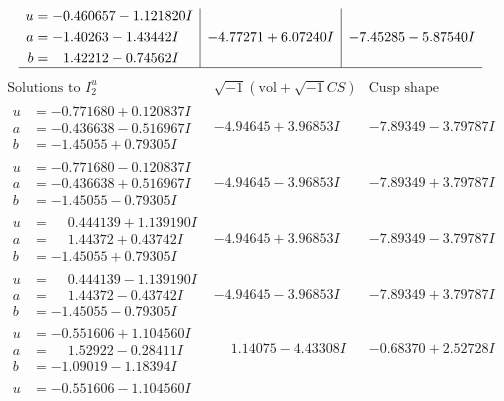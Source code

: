 \documentclass[1p]{elsarticle_modified}
\theoremstyle{definition}
\newcommand{\I}{\sqrt{-1}}
\begin{document}
$$\begin{array}{c|c|c}
\begin{aligned}
u &= -0.460657 - 1.121820 I \\
a &= -1.40263 - 1.43442 I \\
b &= \phantom{-}1.42212 - 0.74562 I\end{aligned}
 & -4.77271 + 6.07240 I & -7.45285 - 5.87540 I\\
 \hline 
 \end{array}$$\newpage$$\begin{array}{c|c|c}  
\text{Solutions to }I^u_{2}& \I (\text{vol} + \sqrt{-1}CS) & \text{Cusp shape}\\
 \hline 
\begin{aligned}
u &= -0.771680 + 0.120837 I \\
a &= -0.436638 - 0.516967 I \\
b &= -1.45055 + 0.79305 I\end{aligned}
 & -4.94645 + 3.96853 I & -7.89349 - 3.79787 I \\ \hline\begin{aligned}
u &= -0.771680 - 0.120837 I \\
a &= -0.436638 + 0.516967 I \\
b &= -1.45055 - 0.79305 I\end{aligned}
 & -4.94645 - 3.96853 I & -7.89349 + 3.79787 I \\ \hline\begin{aligned}
u &= \phantom{-}0.444139 + 1.139190 I \\
a &= \phantom{-}1.44372 + 0.43742 I \\
b &= -1.45055 + 0.79305 I\end{aligned}
 & -4.94645 + 3.96853 I & -7.89349 - 3.79787 I \\ \hline\begin{aligned}
u &= \phantom{-}0.444139 - 1.139190 I \\
a &= \phantom{-}1.44372 - 0.43742 I \\
b &= -1.45055 - 0.79305 I\end{aligned}
 & -4.94645 - 3.96853 I & -7.89349 + 3.79787 I \\ \hline\begin{aligned}
u &= -0.551606 + 1.104560 I \\
a &= \phantom{-}1.52922 - 0.28411 I \\
b &= -1.09019 - 1.18394 I\end{aligned}
 & \phantom{-}1.14075 - 4.43308 I & -0.68370 + 2.52728 I \\ \hline\begin{aligned}
u &= -0.551606 - 1.104560 I \\

\end{aligned}
\end{array}$$
\end{document}
